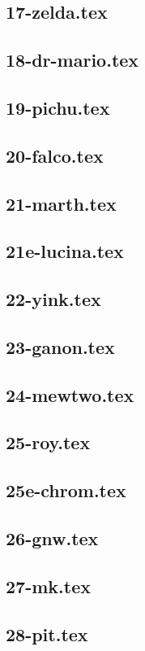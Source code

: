 \subsection{17-zelda.tex}
\subsection{18-dr-mario.tex}
\subsection{19-pichu.tex}
\subsection{20-falco.tex}
\subsection{21-marth.tex}
\subsection{21e-lucina.tex}
\subsection{22-yink.tex}
\subsection{23-ganon.tex}
\subsection{24-mewtwo.tex}
\subsection{25-roy.tex}
\subsection{25e-chrom.tex}
\subsection{26-gnw.tex}
\subsection{27-mk.tex}
\subsection{28-pit.tex}
